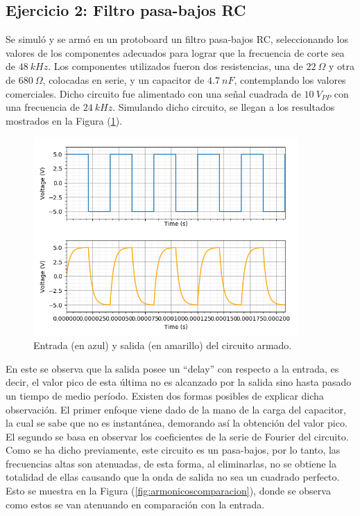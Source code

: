 \documentclass[a4paper]{article}
\begin{document}
\subsection{Ejercicio 2: Filtro pasa-bajos RC}
Se simuló y se armó en un protoboard un filtro pasa-bajos RC, seleccionando los valores de los componentes adecuados para lograr que la frecuencia de corte sea de $ 48 \ kHz $. Los componentes utilizados fueron dos resistencias, una de $22 \ \Omega$ y otra de $680 \ \Omega$, colocadas en serie, y un capacitor de $4.7 \ nF$, contemplando los valores comerciales.
Dicho circuito fue alimentado con una señal cuadrada de $ 10 \ V_{PP} $ con una frecuencia de $ 24 \ kHz $.
Simulando dicho circuito, se llegan a los resultados mostrados en la Figura (\ref{fig:simu2}).

\begin{figure}[H]
	\centering
	\includegraphics[width=0.9\textwidth]{Entrada-Salida.png}
\caption{Entrada (en azul) y salida (en amarillo) del circuito armado.}
	\label{fig:simu2}
\end{figure}

En este se observa que la salida posee un ``delay'' con respecto a la entrada, es decir, el valor pico de esta última no es alcanzado por la salida sino hasta pasado un tiempo de medio período. Existen dos formas posibles de explicar dicha observación.
El primer enfoque viene dado de la mano de la carga del capacitor, la cual se sabe que no es instantánea, demorando así la obtención del valor pico. El segundo se basa en observar los coeficientes de la serie de Fourier del circuito. Como se ha dicho previamente, este circuito es un pasa-bajos, por lo tanto, las frecuencias altas son atenuadas, de esta forma, al eliminarlas, no se obtiene la totalidad de ellas causando que la onda de salida no sea un cuadrado perfecto. Esto se muestra en la Figura (\ref{fig:armonicoscomparacion}), donde se observa como estos se van atenuando en comparación con la entrada.
\end{document}
